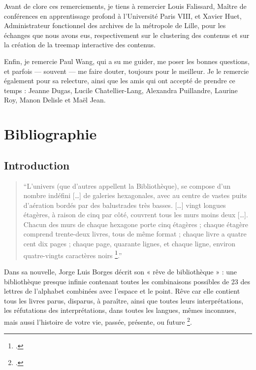 \documentclass[a4paper,12pt,twoside]{book}
\begin{document}
	Avant de clore ces remerciements, je tiens à remercier Louis Falissard, Maître de conférences en apprentissage profond à l’Université Paris VIII, et Xavier Huet, Administrateur fonctionnel des archives de la métropole de Lille, pour les échanges que nous avons eus, respectivement sur le clustering des contenus et sur la création de la treemap interactive des contenus.
	
	Enfin, je remercie Paul Wang, qui a su me guider, me poser les bonnes questions, et parfois — souvent — me faire douter, toujours pour le meilleur. Je le remercie également pour sa relecture, ainsi que les amis qui ont accepté de prendre ce temps : Jeanne Dugas, Lucile Chatellier-Lang, Alexandra Puillandre, Laurine Roy, Manon Delisle et Maël Jean.
	
	\newpage{\pagestyle{empty}\cleardoublepage}
	
	\part*{Bibliographie}
	\printbibliography[keyword=partie1, title={Historique et enjeux}]
	\printbibliography[keyword=partie2, title={Nouvelles interfaces}]
	\printbibliography[keyword=partie3, title={Limites de la notion}]
	
	
	\printbibliography[keyword=dictionnaires, title={Encyclopédies et statistiques}]
	
	
	\chapter{Introduction}	
	 \begin{quote}
	 	\enquote{L’univers (que d’autres appellent la Bibliothèque), se compose d’un nombre indéfini […] de galeries hexagonales, avec au centre de vastes puits d’aération bordés par des balustrades très basses. […] vingt longues étagères, à raison de cinq par côté, couvrent tous les murs moins deux […]. Chacun des murs de chaque hexagone porte cinq étagères ; chaque étagère comprend trente-deux livres, tous de même format ; chaque livre a quatre cent dix pages ; chaque page, quarante lignes, et chaque ligne, environ quatre-vingts caractères noirs \footcite[p. 1]{borges1963}.}
	 \end{quote} 
	
	Dans sa nouvelle, Jorge Luis Borges décrit son « rêve de bibliothèque » : une bibliothèque presque infinie contenant toutes les combinaisons possibles de 23 des lettres de l’alphabet combinées avec l’espace et le point. Rêve car elle contient tous les livres parus, disparus, à paraître, ainsi que toutes leurs interprétations, les réfutations des interprétations, dans toutes les langues, mêmes inconnues, mais aussi l’histoire de votre vie, passée, présente, ou future \footcite{marx}.
	
\end{document}
